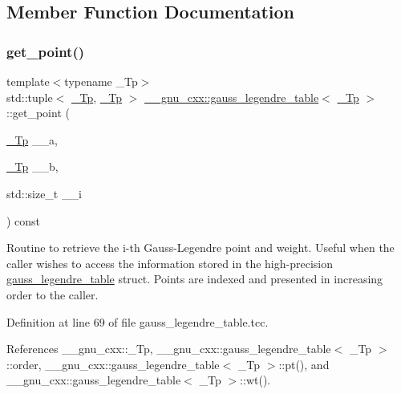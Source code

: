\subsection{Member Function Documentation}
\mbox{\label{struct____gnu__cxx_1_1gauss__legendre__table_a7124fe061efc34ee549245a711b0aab2}} 
\subsubsection{\texorpdfstring{get\+\_\+point()}{get\_point()}}
{\footnotesize\ttfamily template$<$typename \+\_\+\+Tp$>$ \\
std\+::tuple$<$ \hyperlink{namespace____gnu__cxx_a3b19a9c800ca194374ef9172290f7d79}{\+\_\+\+Tp}, \hyperlink{namespace____gnu__cxx_a3b19a9c800ca194374ef9172290f7d79}{\+\_\+\+Tp} $>$ \hyperlink{struct____gnu__cxx_1_1gauss__legendre__table}{\+\_\+\+\_\+gnu\+\_\+cxx\+::gauss\+\_\+legendre\+\_\+table}$<$ \hyperlink{namespace____gnu__cxx_a3b19a9c800ca194374ef9172290f7d79}{\+\_\+\+Tp} $>$\+::get\+\_\+point (\begin{DoxyParamCaption}\item[{\hyperlink{namespace____gnu__cxx_a3b19a9c800ca194374ef9172290f7d79}{\+\_\+\+Tp}}]{\+\_\+\+\_\+a,  }\item[{\hyperlink{namespace____gnu__cxx_a3b19a9c800ca194374ef9172290f7d79}{\+\_\+\+Tp}}]{\+\_\+\+\_\+b,  }\item[{std\+::size\+\_\+t}]{\+\_\+\+\_\+i }\end{DoxyParamCaption}) const}

Routine to retrieve the i-\/th Gauss-\/\+Legendre point and weight. Useful when the caller wishes to access the information stored in the high-\/precision \hyperlink{struct____gnu__cxx_1_1gauss__legendre__table}{gauss\+\_\+legendre\+\_\+table} struct. Points are indexed and presented in increasing order to the caller. 

Definition at line 69 of file gauss\+\_\+legendre\+\_\+table.\+tcc.



References \+\_\+\+\_\+gnu\+\_\+cxx\+::\+\_\+\+Tp, \+\_\+\+\_\+gnu\+\_\+cxx\+::gauss\+\_\+legendre\+\_\+table$<$ \+\_\+\+Tp $>$\+::order, \+\_\+\+\_\+gnu\+\_\+cxx\+::gauss\+\_\+legendre\+\_\+table$<$ \+\_\+\+Tp $>$\+::pt(), and \+\_\+\+\_\+gnu\+\_\+cxx\+::gauss\+\_\+legendre\+\_\+table$<$ \+\_\+\+Tp $>$\+::wt().



